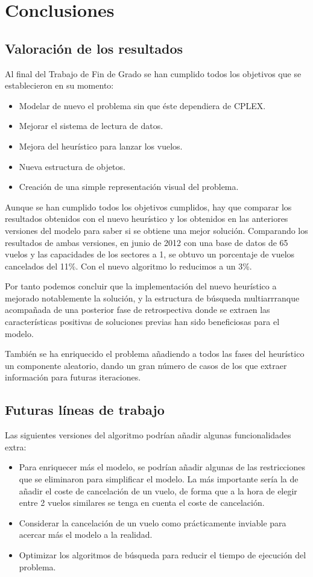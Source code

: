 \chapter{Conclusiones}
\label{conclusiones}
\section{Valoración de los resultados}
Al final del Trabajo de Fin de Grado se han cumplido todos los objetivos que se establecieron en su momento:
\begin{itemize}
	\item Modelar de nuevo el problema sin que éste dependiera de CPLEX.
	\item Mejorar el sistema de lectura de datos. 
	\item Mejora del heurístico para lanzar los vuelos.
	\item Nueva estructura de objetos.
	\item Creación de una simple representación visual del problema.
\end{itemize}
Aunque se han cumplido todos los objetivos cumplidos, hay que comparar los resultados obtenidos con el nuevo heurístico y los obtenidos en las anteriores versiones del modelo para saber si se obtiene una mejor solución. Comparando los resultados de ambas versiones, en junio de 2012 con una base de datos de 65 vuelos y las capacidades de los sectores a 1, se obtuvo un porcentaje de vuelos cancelados del 11\%. Con el nuevo algoritmo lo reducimos a un 3\%.

Por tanto podemos concluir que la implementación del nuevo heurístico a mejorado notablemente la solución, y la estructura de búsqueda multiarrranque acompañada de una posterior fase de retrospectiva donde se extraen las características positivas de soluciones previas han sido beneficiosas para el modelo.

También se ha enriquecido el problema añadiendo a todos las fases del heurístico un componente aleatorio, dando un gran número de casos de los que extraer información para futuras iteraciones. 
\section{Futuras líneas de trabajo}
Las siguientes versiones del algoritmo podrían añadir algunas funcionalidades extra:
\begin{itemize}
	\item Para enriquecer más el modelo, se podrían añadir algunas de las restricciones que se eliminaron para simplificar el modelo. La más importante sería la de añadir el coste de cancelación de un vuelo, de forma que a la hora de elegir entre 2 vuelos similares se tenga en cuenta el coste de cancelación.
	\item Considerar la cancelación de un vuelo como prácticamente inviable para acercar más el modelo a la realidad.
	\item Optimizar los algoritmos de búsqueda para reducir el tiempo de ejecución del problema.
\end{itemize}


